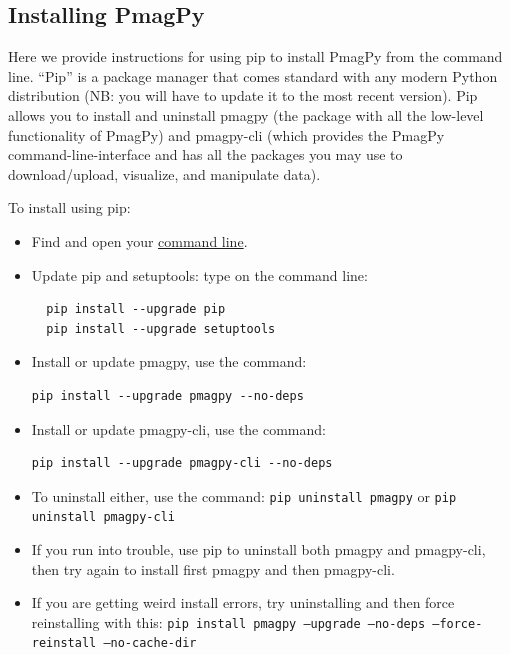\documentclass[11pt]{book}
\begin{document}
{%

 \subsection{Installing PmagPy}

 Here we provide instructions for using pip to install PmagPy from the command line.
       ``Pip'' is a package manager that comes standard with any modern Python distribution (NB: you will have to update it to the most recent version).  Pip allows you to install and uninstall pmagpy (the package with all the low-level functionality of PmagPy) and pmagpy-cli (which provides the PmagPy command-line-interface and has all the packages you may use to download/upload, visualize, and manipulate data).


  To install using pip:

  \begin{itemize}
     \item Find  and open your \href{#command_line}{command line}.
     \item Update pip and setuptools: type on  the command line: \begin{verbatim}
  pip install --upgrade pip
  pip install --upgrade setuptools\end{verbatim}
     \item Install or update pmagpy, use the command: \begin{verbatim}pip install --upgrade pmagpy --no-deps \end{verbatim}
     \item Install or update pmagpy-cli, use the command: \begin{verbatim}pip install --upgrade pmagpy-cli --no-deps \end{verbatim}
     \item To uninstall either, use the command: \texttt{pip uninstall pmagpy} or \texttt{pip uninstall pmagpy-cli}
     \item If you run into trouble, use pip to uninstall both pmagpy and pmagpy-cli, then try again to install first pmagpy and then pmagpy-cli.
     \item If you are getting weird install errors, try uninstalling and then force reinstalling with this: \texttt{pip install pmagpy --upgrade --no-deps --force-reinstall --no-cache-dir}
   \end{itemize}

}
\end{document}

